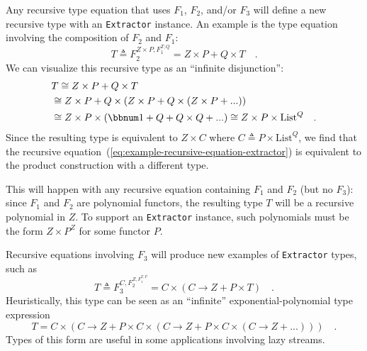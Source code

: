 Any recursive type equation that uses $F_{1}$, $F_{2}$, and/or $F_{3}$
will define a new recursive type with an \lstinline!Extractor! instance.
An example is the type equation involving the composition of $F_{2}$
and $F_{1}$:
\begin{equation}
T\triangleq F_{2}^{Z\times P,F_{1}^{T,Q}}=Z\times P+Q\times T\quad.\label{eq:example-recursive-equation-extractor}
\end{equation}
We can visualize this recursive type as an \textsf{``}infinite disjunction\textsf{''}:
\begin{align*}
 & T\cong Z\times P+Q\times T\\
 & \cong Z\times P+Q\times\left(Z\times P+Q\times\left(Z\times P+...\right)\right)\\
 & \cong Z\times P\times(\bbnum 1+Q+Q\times Q+...)\cong Z\times P\times\text{List}^{Q}\quad.
\end{align*}
Since the resulting type is equivalent to $Z\times C$ where $C\triangleq P\times\text{List}^{Q}$,
we find that the recursive equation~(\ref{eq:example-recursive-equation-extractor})
is equivalent to the product construction with a different type.

This will happen with any recursive equation containing $F_{1}$ and
$F_{2}$ (but no $F_{3}$): since $F_{1}$ and $F_{2}$ are polynomial
functors, the resulting type $T$ will be a recursive polynomial in
$Z$. To support an \lstinline!Extractor! instance, such polynomials
must be the form $Z\times P^{Z}$ for some functor $P$.

Recursive equations involving $F_{3}$ will produce new examples of
\lstinline!Extractor! types, such as
\begin{equation}
T\triangleq F_{3}^{C,F_{2}^{Z,F_{1}^{T,P}}}=C\times\left(C\rightarrow Z+P\times T\right)\quad.\label{eq:example-good-recursive-equation-extractor}
\end{equation}
Heuristically, this type can be seen as an \textsf{``}infinite\textsf{''} exponential-polynomial
type expression
\[
T=C\times\left(C\rightarrow Z+P\times C\times\left(C\rightarrow Z+P\times C\times\left(C\rightarrow Z+...\right)\right)\right)\quad.
\]
Types of this form are useful in some applications involving lazy
streams.

